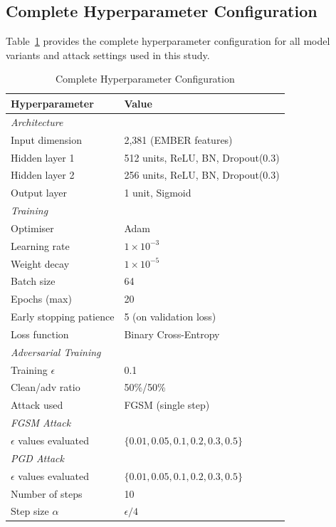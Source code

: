 \documentclass[conference]{IEEEtran}
\begin{document}
\subsection{Complete Hyperparameter Configuration}

Table~\ref{tab:hyperparams} provides the complete hyperparameter configuration for all model variants and attack settings used in this study.

\begin{table}[htbp]
\centering
\caption{Complete Hyperparameter Configuration}
\label{tab:hyperparams}
\setlength{\tabcolsep}{5pt}
\begin{tabular}{lp{4.0cm}}
\toprule
\textbf{Hyperparameter} & \textbf{Value} \\
\midrule
\multicolumn{2}{l}{\textit{Architecture}} \\
Input dimension & 2,381 (EMBER features) \\
Hidden layer 1 & 512 units, ReLU, BN, Dropout(0.3) \\
Hidden layer 2 & 256 units, ReLU, BN, Dropout(0.3) \\
Output layer & 1 unit, Sigmoid \\
\midrule
\multicolumn{2}{l}{\textit{Training}} \\
Optimiser & Adam \\
Learning rate & $1 \times 10^{-3}$ \\
Weight decay & $1 \times 10^{-5}$ \\
Batch size & 64 \\
Epochs (max) & 20 \\
Early stopping patience & 5 (on validation loss) \\
Loss function & Binary Cross-Entropy \\
\midrule
\multicolumn{2}{l}{\textit{Adversarial Training}} \\
Training $\epsilon$ & 0.1 \\
Clean/adv ratio & 50\%/50\% \\
Attack used & FGSM (single step) \\
\midrule
\multicolumn{2}{l}{\textit{FGSM Attack}} \\
$\epsilon$ values evaluated & $\{0.01, 0.05, 0.1, 0.2, 0.3, 0.5\}$ \\
\midrule
\multicolumn{2}{l}{\textit{PGD Attack}} \\
$\epsilon$ values evaluated & $\{0.01, 0.05, 0.1, 0.2, 0.3, 0.5\}$ \\
Number of steps & 10 \\
Step size $\alpha$ & $\epsilon / 4$ \\

\end{tabular}
\end{table}
\end{document}

